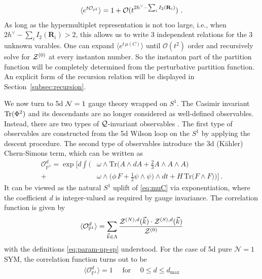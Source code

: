 \documentclass[letterpaper, 11pt]{article}
\def\IP{\mathbb{P}}
\def\CN{{\cal N}}
\def\CO{{\cal O}}
\def\CQ{{\cal Q}}
\def\CZ{{\cal Z}}
\def\Tr{{\rm Tr}}
\begin{document}
\begin{align}
  \label{eq:donaldson-4d}
  \langle e^{t {\CO}_{\IP^1}}\rangle = 1 + \CO(t^{2h^\vee - \sum_i I_2(\mathbf{R}_i)})  \ . 
\end{align}
As long as the hypermultiplet representation is not too large, i.e., when $2h^\vee - \sum_i I_2(\mathbf{R}_i) > 2$, this allows us to write 3 independent relations for the 3 unknown varables. One can expand $\langle e^{t \, \mu(C)}\rangle$ until $\mathcal{O}(t^2)$ order and recursively solve for $\CZ^{(0)}$ at every instanton number. So the instanton part of the partition function will be completely determined from the perturbative partition function. An explicit form of the recursion relation will be displayed in Section~\ref{subsec:recursion}.

We now turn to 5d $\CN=1$ gauge theory wrapped on $S^1$. The Casimir invariant $\Tr (\Phi^2)$ and its descendants are no longer considered as well-defined observables. Instead, there are two types of $\CQ$-invariant observables \cite{Baulieu:1997nj}. The first type of observables are constructed from the 5d Wilson loop on the $S^1$ by applying the descent procedure. The second type of observables introduce the 3d (K\"ahler) Chern-Simons term, which can be written as \cite{Losev:1995cr,Baulieu:1997nj}
\begin{align} 
  \mathcal{O}_{\IP^1}^{d} = \exp\bigg[
    d\int \bigg( & \omega \wedge \text{Tr}\Big(A \wedge dA + \frac{2}{3}A\wedge A \wedge A \Big) \\ \nonumber
     + &\omega \wedge \Big( \phi \, F + \frac{1}{2}\psi \wedge \psi \Big)\wedge dt + H\, \text{Tr}\Big( F \wedge F \Big) \bigg)
     \bigg] \ .
\end{align}
It can be viewed as the natural $S^1$ uplift of \eqref{eq:muC} via exponentiation, where the coefficient $d$ is integer-valued as required by gauge invariance. The correlation function is given by
\begin{align}
  \label{eq:cor5d}
  \langle \mathcal{O}_{\IP^1}^{d}\rangle = \sum_{\vec{k} \in \Lambda}  \frac{\CZ^{(N),d}(\vec{k}) \cdot \CZ^{(S),d}(\vec{k})}{\CZ^{(0)}}
\end{align} 
with the definitions \eqref{eq:param-np-sp} understood. For the case of 5d pure $\mathcal{N}=1$ SYM, the correlation function turns out to be \cite{Nakajima:2005fg} 
\begin{align}
  \label{eq:cor5d-unity}
  \langle \mathcal{O}_{\IP^1}^{d}\rangle = 1 \quad \text{ for }\quad 0\leq d \leq d_\text{max}
\end{align}
\end{document}
